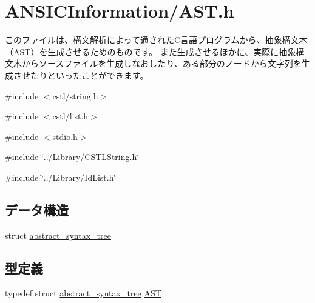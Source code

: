 \section{ANSICInformation/AST.h}
\label{AST_8h}


このファイルは、構文解析によって通されたC言語プログラムから、抽象構文木（AST）を生成させるためのものです。 また生成させるほかに、実際に抽象構文木からソースファイルを生成しなおしたり、ある部分のノードから文字列を生成させたりといったことができます。  


{\ttfamily \#include $<$cstl/string.h$>$}\par
{\ttfamily \#include $<$cstl/list.h$>$}\par
{\ttfamily \#include $<$stdio.h$>$}\par
{\ttfamily \#include \char`\"{}../Library/CSTLString.h\char`\"{}}\par
{\ttfamily \#include \char`\"{}../Library/IdList.h\char`\"{}}\par
\subsection*{データ構造}
\begin{DoxyCompactItemize}
\item 
struct \hyperlink{structabstract__syntax__tree}{abstract\_\-syntax\_\-tree}
\end{DoxyCompactItemize}
\subsection*{型定義}
\begin{DoxyCompactItemize}
\item 
typedef struct \hyperlink{structabstract__syntax__tree}{abstract\_\-syntax\_\-tree} \hyperlink{AST_8h_a33c4b549d3cbe5707e6529c36050be6a}{AST}
\end{DoxyCompactItemize}
